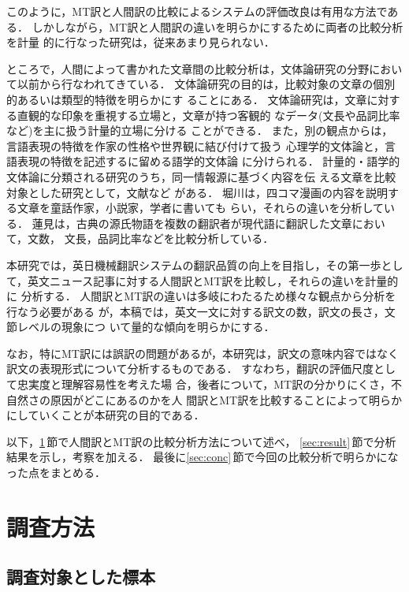 このように，MT訳と人間訳の比較によるシステムの評価改良は有用な方法である．
しかしながら，MT訳と人間訳の違いを明らかにするために両者の比較分析を計量
的に行なった研究は，従来あまり見られない．

ところで，人間によって書かれた文章間の比較分析は，文体論研究の分野におい
て以前から行なわれてきている\cite{Yamaguchi79}．
文体論研究の目的は，比較対象の文章の個別的あるいは類型的特徴を明らかにす
ることにある．
文体論研究は，文章に対する直観的な印象を重視する立場と，文章が持つ客観的
なデータ(文長や品詞比率など)を主に扱う計量的立場\cite{Hatano65}に分ける
ことができる．
また，別の観点からは，言語表現の特徴を作家の性格や世界観に結び付けて扱う
心理学的文体論と，言語表現の特徴を記述するに留める語学的文体論
\cite{Kabashima63}に分けられる． 
計量的・語学的文体論に分類される研究のうち，同一情報源に基づく内容を伝
える文章を比較対象とした研究として，文献\cite{Horikawa79,Hasumi91}など
がある．
堀川は，四コマ漫画の内容を説明する文章を童話作家，小説家，学者に書いても
らい，それらの違いを分析している．
蓮見は，古典の源氏物語を複数の翻訳者が現代語に翻訳した文章において，文数，
文長，品詞比率などを比較分析している．

本研究では，英日機械翻訳システムの翻訳品質の向上を目指し，その第一歩とし
て，英文ニュース記事に対する人間訳とMT訳を比較し，それらの違いを計量的に
分析する．
人間訳とMT訳の違いは多岐にわたるため様々な観点から分析を行なう必要がある
が，本稿では，英文一文に対する訳文の数，訳文の長さ，文節レベルの現象につ
いて量的な傾向を明らかにする．

なお，特にMT訳には誤訳の問題があるが，本研究は，訳文の意味内容ではなく
訳文の表現形式について分析するものである．
すなわち，翻訳の評価尺度として忠実度と理解容易性\cite{Nagao85}を考えた場
合，後者について，MT訳の分かりにくさ，不自然さの原因がどこにあるのかを人
間訳とMT訳を比較することによって明らかにしていくことが本研究の目的である．

以下，\ref{sec:method}\,節で人間訳とMT訳の比較分析方法について述べ，
\ref{sec:result}\,節で分析結果を示し，考察を加える．
最後に\ref{sec:conc}\,節で今回の比較分析で明らかになった点をまとめる．


\section{調査方法}
\label{sec:method}

\subsection{調査対象とした標本}
\label{sec:method:corpus}

